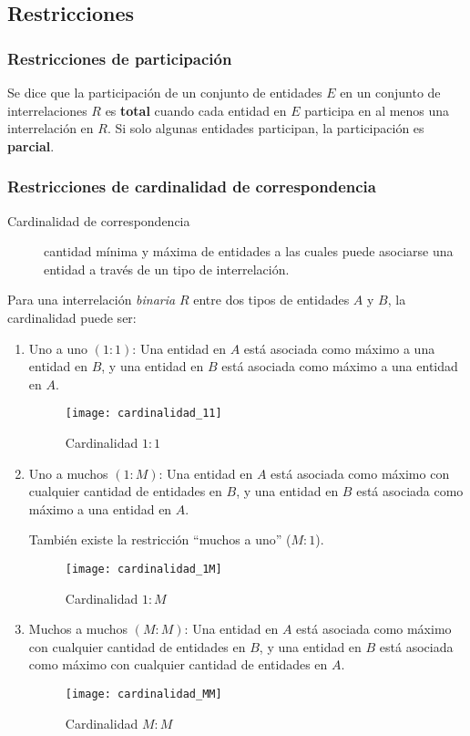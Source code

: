 \documentclass[a4paper, twoside]{article}
\begin{document}
\subsection{Restricciones}
\subsubsection{Restricciones de participación}
Se dice que la participación de un conjunto de entidades $E$ en un conjunto de interrelaciones $R$ es \textbf{total} cuando cada entidad en $E$ participa en al menos una interrelación en $R$. Si solo algunas entidades participan, la participación es \textbf{parcial}.

\subsubsection{Restricciones de cardinalidad de correspondencia}
\begin{description}
	\item[Cardinalidad de correspondencia] cantidad mínima y máxima de entidades a las cuales puede asociarse una entidad a través de un tipo de interrelación.
\end{description}

Para una interrelación \emph{binaria} $R$ entre dos tipos de entidades $A$ y $B$, la cardinalidad puede ser:
\begin{enumerate}
	\item Uno a uno $(1:1)$: Una entidad en $A$ está asociada como máximo a una entidad en $B$, y una entidad en $B$ está asociada como máximo a una entidad en $A$.
	\begin{figure}[H]
		\centering
		\texttt{[image: cardinalidad\_11]}
		\caption{Cardinalidad $1:1$}
	\end{figure}

	\item Uno a muchos $(1:M)$: Una entidad en $A$ está asociada como máximo con cualquier cantidad de entidades en $B$, y una entidad en $B$ está asociada como máximo a una entidad en $A$.

	También existe la restricción ``muchos a uno'' ($M:1$).
	\begin{figure}[H]
		\centering
		\texttt{[image: cardinalidad\_1M]}
		\caption{Cardinalidad $1:M$}
	\end{figure}

	\item Muchos a muchos $(M:M)$: Una entidad en $A$ está asociada como máximo con cualquier cantidad de entidades en $B$, y una entidad en $B$ está asociada como máximo con cualquier cantidad de entidades en $A$.
	\begin{figure}[H]
		\centering
		\texttt{[image: cardinalidad\_MM]}
		\caption{Cardinalidad $M:M$}
	\end{figure}
\end{enumerate}
\end{document}
